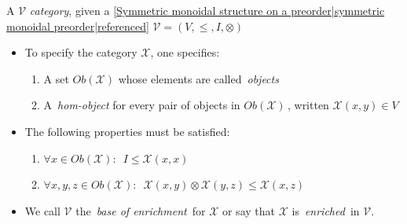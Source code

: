 
A $\mathcal{V}$ \emph{category}, given a \ref{Symmetric monoidal structure on a preorder|symmetric monoidal preorder|referenced} $\mathcal{V}=(V,\leq,I,\otimes)$

\begin{itemize}
    \item To specify the category $\mathcal{X}$, one specifies:
          \begin{enumerate}
            \item A set $Ob(\mathcal{X})$ whose elements are called \,\emph{objects}\,
            \item A \,\emph{hom-object} for every pair of objects in $Ob(\mathcal{X})$\,, written $\mathcal{X}(x,y) \in V$
          \end{enumerate}
    \item The following properties must be satisfied:
          \begin{enumerate}
            \item $\forall x \in Ob(\mathcal{X}):$ \,$I \leq \mathcal{X}(x,x)$\,
            \item $\forall x,y,z \in Ob(\mathcal{X}):$ \,$\mathcal{X}(x,y)\otimes\mathcal{X}(y,z) \leq \mathcal{X}(x,z)$\,
          \end{enumerate}
    \item We call $\mathcal{V}$ the\, \emph{base of enrichment}\, for $\mathcal{X}$ or say that $\mathcal{X}$ is\, \emph{enriched}\, in $\mathcal{V}$.
  \end{itemize}
